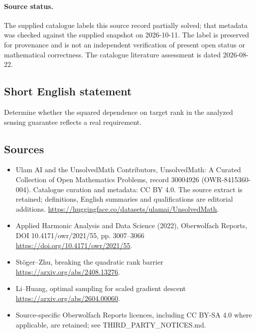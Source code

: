 \documentclass[11pt]{article}
\begin{document}
\paragraph{Source status.}
The supplied catalogue labels this source record partially solved; that metadata was checked against the supplied snapshot on 2026-10-11. The label is preserved for provenance and is not an independent verification of present open status or mathematical correctness. The catalogue literature assessment is dated 2026-08-22.
\subsection{Short English statement}
Determine whether the squared dependence on target rank in the analyzed sensing guarantee reflects a real requirement.
\subsection{Sources}
\begin{itemize}
\item[\hypertarget{source:30004926:1}{S1}] Ulam AI and the UnsolvedMath Contributors, UnsolvedMath: A Curated Collection of Open Mathematics Problems, record 30004926 (OWR-8415360-004). Catalogue curation and metadata: CC BY 4.0. The source extract is retained; definitions, English summaries and qualifications are editorial additions.
\url{https://huggingface.co/datasets/ulamai/UnsolvedMath}.
\item[\hypertarget{source:30004926:2}{S2}] Applied Harmonic Analysis and Data Science (2022), Oberwolfach Reports, DOI 10.4171/owr/2021/55, pp. 3007--3066
\url{https://doi.org/10.4171/owr/2021/55}.
\item[\hypertarget{source:30004926:3}{S3}] Stöger--Zhu, breaking the quadratic rank barrier
\url{https://arxiv.org/abs/2408.13276}.
\item[\hypertarget{source:30004926:4}{S4}] Li--Huang, optimal sampling for scaled gradient descent
\url{https://arxiv.org/abs/2604.00060}.
\item Source-specific Oberwolfach Reports licences, including CC BY-SA 4.0 where applicable, are retained; see THIRD\_PARTY\_NOTICES.md.
\end{itemize}
\end{document}
